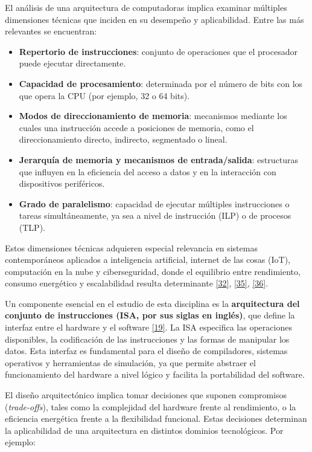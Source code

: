 \documentclass[12pt,oneside]{templates/unerthesis}
\providecommand{\tightlist}{%
  \setlength{\itemsep}{0pt}\setlength{\parskip}{0pt}}
\begin{document}
El análisis de una arquitectura de computadoras implica examinar múltiples dimensiones técnicas que inciden en su desempeño y aplicabilidad. Entre las más relevantes se encuentran:

\begin{itemize}
\tightlist
\item
  \textbf{Repertorio de instrucciones}: conjunto de operaciones que el procesador puede ejecutar directamente.
\item
  \textbf{Capacidad de procesamiento}: determinada por el número de bits con los que opera la CPU (por ejemplo, 32 o 64 bits).
\item
  \textbf{Modos de direccionamiento de memoria}: mecanismos mediante los cuales una instrucción accede a posiciones de memoria, como el direccionamiento directo, indirecto, segmentado o lineal.
\item
  \textbf{Jerarquía de memoria y mecanismos de entrada/salida}: estructuras que influyen en la eficiencia del acceso a datos y en la interacción con dispositivos periféricos.
\item
  \textbf{Grado de paralelismo}: capacidad de ejecutar múltiples instrucciones o tareas simultáneamente, ya sea a nivel de instrucción (ILP) o de procesos (TLP).
\end{itemize}

Estos dimensiones técnicas adquieren especial relevancia en sistemas contemporáneos aplicados a inteligencia artificial, internet de las cosas (IoT), computación en la nube y ciberseguridad, donde el equilibrio entre rendimiento, consumo energético y escalabilidad resulta determinante \protect\hyperlink{ref-harris2015digital}{{[}32{]}}, \protect\hyperlink{ref-patterson_computer_2016}{{[}35{]}}, \protect\hyperlink{ref-belli2020iot}{{[}36{]}}.

Un componente esencial en el estudio de esta disciplina es la \textbf{arquitectura del conjunto de instrucciones (ISA, por sus siglas en inglés)}, que define la interfaz entre el hardware y el software \protect\hyperlink{ref-hennessy2017computer}{{[}19{]}}. La ISA especifica las operaciones disponibles, la codificación de las instrucciones y las formas de manipular los datos. Esta interfaz es fundamental para el diseño de compiladores, sistemas operativos y herramientas de simulación, ya que permite abstraer el funcionamiento del hardware a nivel lógico y facilita la portabilidad del software.

El diseño arquitectónico implica tomar decisiones que suponen compromisos (\emph{trade-offs}), tales como la complejidad del hardware frente al rendimiento, o la eficiencia energética frente a la flexibilidad funcional. Estas decisiones determinan la aplicabilidad de una arquitectura en distintos dominios tecnológicos. Por ejemplo:
\end{document}
